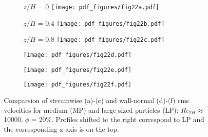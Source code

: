 \documentclass{jfm}
\begin{document}
\begin{figure}
\centering
\begin{subfigure}{.24\textwidth}
  \centering
  $z/H$ = 0
  \texttt{[image: pdf\_figures/fig22a.pdf]}
  \caption{}
  \label{fig:3_6mm_20p_Re10000_sp00mm_urms}
\end{subfigure}%
\begin{subfigure}{.24\textwidth}
  \centering
  $z/H$ = 0.4
  \texttt{[image: pdf\_figures/fig22b.pdf]}
  \caption{}
  \label{fig:3_6mm_20p_Re10000_sp10mm_urms}
\end{subfigure}
\begin{subfigure}{.24\textwidth}
  \centering
  $z/H$ = 0.8
  \texttt{[image: pdf\_figures/fig22c.pdf]}
  \caption{}
  \label{fig:3_6mm_20p_Re10000_sp20mm_urms}
\end{subfigure}

\begin{subfigure}{.24\textwidth}
  \centering
  \texttt{[image: pdf\_figures/fig22d.pdf]}
  \caption{}
  \label{fig:3_6mm_20p_Re10000_sp00mm_vrms}
\end{subfigure}%
\begin{subfigure}{.24\textwidth}
  \centering
  \texttt{[image: pdf\_figures/fig22e.pdf]}
  \caption{}
  \label{fig:3_6mm_20p_Re10000_sp10mm_vrms}
\end{subfigure}
\begin{subfigure}{.24\textwidth}
  \centering
  \texttt{[image: pdf\_figures/fig22f.pdf]}
  \caption{}
  \label{fig:3_6mm_20p_Re10000_sp20mm_vrms}
\end{subfigure}
\caption{Comparsion of streamwise (a)-(c) and wall-normal (d)-(f) rms velocities for medium (MP) and large-sized particles (LP): $Re_{2H}\approx$ 10000, $\phi$ = 20\%. Profiles shifted to the right correspond to LP and the corresponding x-axis is on the top.}
\label{fig:3_6mm_20p_Re10000_urms_vrms}
\end{figure}
\end{document}
